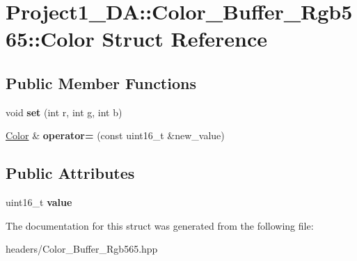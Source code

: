\hypertarget{struct_project1__3_d_a_1_1_color___buffer___rgb565_1_1_color}{}\section{Project1\+\_\+DA\+::Color\+\_\+\+Buffer\+\_\+\+Rgb565\+::Color Struct Reference}
\label{struct_project1__3_d_a_1_1_color___buffer___rgb565_1_1_color}
\subsection*{Public Member Functions}
\begin{DoxyCompactItemize}
\item 
\mbox{\label{struct_project1__3_d_a_1_1_color___buffer___rgb565_1_1_color_ac9dde65d7b99003223fa10614015d0d6}} 
void {\bfseries set} (int r, int g, int b)
\item 
\mbox{\label{struct_project1__3_d_a_1_1_color___buffer___rgb565_1_1_color_ae17e7c168535c60c485e3797ab27e07d}} 
\mbox{\hyperlink{struct_project1__3_d_a_1_1_color___buffer___rgb565_1_1_color}{Color}} \& {\bfseries operator=} (const uint16\+\_\+t \&new\+\_\+value)
\end{DoxyCompactItemize}
\subsection*{Public Attributes}
\begin{DoxyCompactItemize}
\item 
\mbox{\label{struct_project1__3_d_a_1_1_color___buffer___rgb565_1_1_color_a0191f3396452c6cf16c41e8ed2f1fc27}} 
uint16\+\_\+t {\bfseries value}
\end{DoxyCompactItemize}


The documentation for this struct was generated from the following file\+:\begin{DoxyCompactItemize}
\item 
headers/Color\+\_\+\+Buffer\+\_\+\+Rgb565.\+hpp\end{DoxyCompactItemize}
